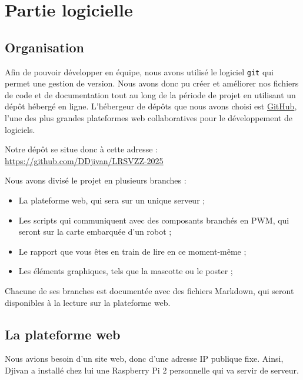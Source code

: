 \documentclass[a4paper,12pt]{report}  %
\begin{document}
\section{Partie logicielle}
\subsection{Organisation}

Afin de pouvoir développer en équipe, nous avons utilisé le logiciel \texttt{git} qui permet une gestion de version. Nous avons donc pu créer et améliorer nos fichiers de code et de documentation tout au long de la période de projet en utilisant un dépôt hébergé en ligne. L'hébergeur de dépôts que nous avons choisi est \href{https://github.com/}{GitHub}, l'une des plus grandes plateformes web collaboratives pour le développement de logiciels. 

Notre dépôt se situe donc à cette adresse : \href{https://github.com/DDjivan/LRSVZZ-2025}{https://github.com/DDjivan/LRSVZZ-2025}

Nous avons divisé le projet en plusieurs branches : 

\begin{itemize}
	\item La plateforme web, qui sera sur un unique serveur ; 
	
	\item Les scripts qui communiquent avec des composants branchés en PWM, qui seront sur la carte embarquée d'un robot ; 
	
	\item Le rapport que vous êtes en train de lire en ce moment-même ; 
	
	\item Les éléments graphiques, tels que la mascotte ou le poster ; 
	
\end{itemize}

Chacune de ses branches est documentée avec des fichiers Markdown, qui seront disponibles à la lecture sur la plateforme web. 


\subsection{La plateforme web}

Nous avions besoin d'un site web, donc d'une adresse IP publique fixe. Ainsi, Djivan a installé chez lui une Raspberry Pi 2 personnelle qui va servir de serveur. 
\end{document}
